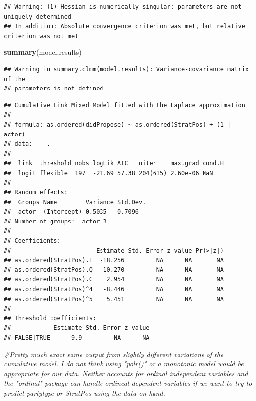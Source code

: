 \documentclass[]{article}
\newenvironment{Shaded}{\begin{snugshade}}{\end{snugshade}}
\newcommand{\CommentTok}[1]{\textcolor[rgb]{0.56,0.35,0.01}{\textit{#1}}}
\newcommand{\KeywordTok}[1]{\textcolor[rgb]{0.13,0.29,0.53}{\textbf{#1}}}
\newcommand{\NormalTok}[1]{#1}
\begin{document}
\begin{verbatim}
## Warning: (1) Hessian is numerically singular: parameters are not uniquely determined 
## In addition: Absolute convergence criterion was met, but relative criterion was not met
\end{verbatim}

\begin{Shaded}
\begin{Highlighting}[]
\KeywordTok{summary}\NormalTok{(model.results)}
\end{Highlighting}
\end{Shaded}

\begin{verbatim}
## Warning in summary.clmm(model.results): Variance-covariance matrix of the
## parameters is not defined
\end{verbatim}

\begin{verbatim}
## Cumulative Link Mixed Model fitted with the Laplace approximation
## 
## formula: as.ordered(didPropose) ~ as.ordered(StratPos) + (1 | actor)
## data:    .
## 
##  link  threshold nobs logLik AIC   niter    max.grad cond.H
##  logit flexible  197  -21.69 57.38 204(615) 2.60e-06 NaN   
## 
## Random effects:
##  Groups Name        Variance Std.Dev.
##  actor  (Intercept) 0.5035   0.7096  
## Number of groups:  actor 3 
## 
## Coefficients:
##                        Estimate Std. Error z value Pr(>|z|)
## as.ordered(StratPos).L  -18.256         NA      NA       NA
## as.ordered(StratPos).Q   10.270         NA      NA       NA
## as.ordered(StratPos).C    2.954         NA      NA       NA
## as.ordered(StratPos)^4   -8.446         NA      NA       NA
## as.ordered(StratPos)^5    5.451         NA      NA       NA
## 
## Threshold coefficients:
##            Estimate Std. Error z value
## FALSE|TRUE     -9.9         NA      NA
\end{verbatim}

\begin{Shaded}
\begin{Highlighting}[]
\CommentTok{#Pretty much exact same output from slightly different variations of the cumulative model. I do not think using "polr()" or a monotonic model would be appropriate for our data. Neither accounts for ordinal independent variables and the "ordinal" package can handle ordincal dependent variables if we want to try to predict partytype or StratPos using the data on hand.}
\end{Highlighting}
\end{Shaded}
\end{document}
